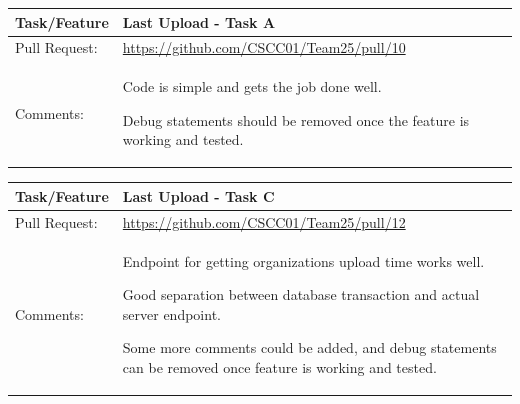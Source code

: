 \documentclass[12pt]{article}
\begin{document}
\begin{table}[H]
\begin{tabular}{|p{3cm}|p{11cm}|}
\hline
Task/Feature  & Last Upload - Task A
 \\ \hline
Pull Request: & \url{https://github.com/CSCC01/Team25/pull/10}                                                                                                                                                                                                                                                                                                                      \\ \hline

Comments:     & Code is simple and gets the job done well.

Debug statements should be removed once the feature is working and tested.

 \\ \hline
\end{tabular}
\end{table}

\begin{table}[H]
\begin{tabular}{|p{3cm}|p{11cm}|}
\hline
Task/Feature  & Last Upload - Task C
 \\ \hline
Pull Request: & \url{https://github.com/CSCC01/Team25/pull/12}                                                                                                                                                                                                                                                                                                                      \\ \hline

Comments:     & Endpoint for getting organizations upload time works well.

Good separation between database transaction and actual server endpoint.

Some more comments could be added, and debug statements can be removed once feature is working and tested.


 \\ \hline
\end{tabular}
\end{table}

\newpage


\end{document}
